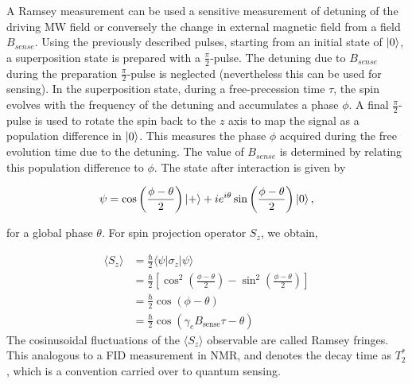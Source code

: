 A Ramsey measurement can be used a sensitive measurement of detuning of the driving  \gls{MW} field or conversely the change in external magnetic field from a field $B_{sense}$. Using the previously described pulses, starting from an initial state of $\ket{0}$, a superposition state is prepared with a $\frac{\pi}{2}$-pulse. The detuning due to $B_{sense}$ during the preparation $\frac{\pi}{2}$-pulse is neglected (nevertheless this can be used for sensing\cite{herbQuantumMagnetometryTransient2025}). In the superposition state, during a free-precession time $\tau$, the spin evolves with the frequency of the detuning and accumulates a phase $\phi$. A final $\frac{\pi}{2}$-pulse is used to rotate the spin back to the $z$ axis to map the signal as a population difference in $\ket{0}$. This measures the phase $\phi$ acquired during the free evolution time due to the detuning. The value of $B_{sense}$ is determined by relating this population difference to $\phi$. The state after interaction is given by

\begin{equation}
    \psi = \cos \left( \frac{\phi-\theta}{2} \right) \ket{+} + i e^{i\theta} \sin \left( \frac{\phi-\theta}{2} \right) \ket{0},
\end{equation}

for a global phase $\theta$. For spin projection operator $S_z$, we obtain,

\begin{equation}
    \begin{split}
        \langle S_z \rangle &= \frac{\hbar}{2} \langle \psi \rvert \sigma_z \lvert \psi \rangle \\
    &= \frac{\hbar}{2} \left[ \cos^2\left( \frac{\phi - \theta}{2} \right) - \sin^2\left( \frac{\phi - \theta}{2} \right) \right] \\
    &= \frac{\hbar}{2} \cos(\phi - \theta) \\
    &= \frac{\hbar}{2} \cos(\gamma_e B_{\text{sense}} \tau - \theta)
    \end{split}
\end{equation}
The cosinusoidal fluctuations of the $\langle S_z \rangle$ observable are called Ramsey fringes. This analogous to a \gls{FID} measurement in \gls{NMR}, and denotes the decay time as $T_2^*$, which is a convention carried over to quantum sensing.

